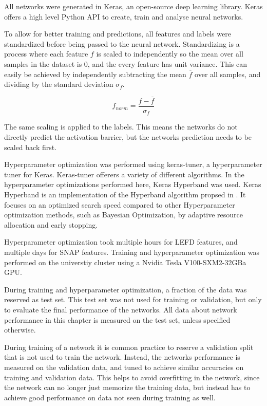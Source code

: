 All networks were generated in Keras, an open-source deep learning library.
Keras offers a high level Python API to create, train and analyse neural networks.

To allow for better training and predictions, all features and labels were standardized before being passed to the neural network.
Standardizing is a process where each feature $f$ is scaled to independently so the mean over all samples in the dataset is 0, 
and the every feature has unit variance.
This can easily be achieved by independently subtracting the mean $\overline{f}$ over all samples, and dividing by the standard deviation $\sigma_f$.

$$
f_{norm} = \frac{f- \overline{f}}{\sigma_f}
$$

The same scaling is applied to the labels.
This means the networks do not directly predict the activation barrier, but the networks prediction needs to be scaled back first.

Hyperparameter optimization was performed using keras-tuner, a hyperparameter tuner for Keras.
Keras-tuner offerers a variety of different algorithms.
In the hyperparameter optimizations performed here, Keras Hyperband was used.
Keras Hyperband is an  implementation of the Hyperband algorithm propsed in \cite{li2017hyperband}.
It focuses on an optimized search speed compared to other Hyperparameter optimization methods, such as
Bayesian Optimization, by adaptive resource allocation and early stopping.

Hyperparameter optimization took multiple hours for LEFD features, 
and multiple days for SNAP features.
Training and hyperparameter optimization was performed on the universtiy cluster %
using a Nvidia Tesla V100-SXM2-32GBa GPU.

During training and hyperparameter optimization, a fraction of the data was reserved as test set.
This test set was not used for training or validation, but only to evaluate the final performance of the networks.
All data about network performance in this chapter is measured on the test set, unless specified otherwise.

During training of a network it is common practice to reserve a validation split that is not used to train the network.
Instead, the networks performance is measured on the validation data, and tuned to achieve similar accuracies on
training and validation data.
This helps to avoid overfitting in the network, since the network can no longer just memorize the training
data, but instead has to achieve good performance on data not seen during training as well.

